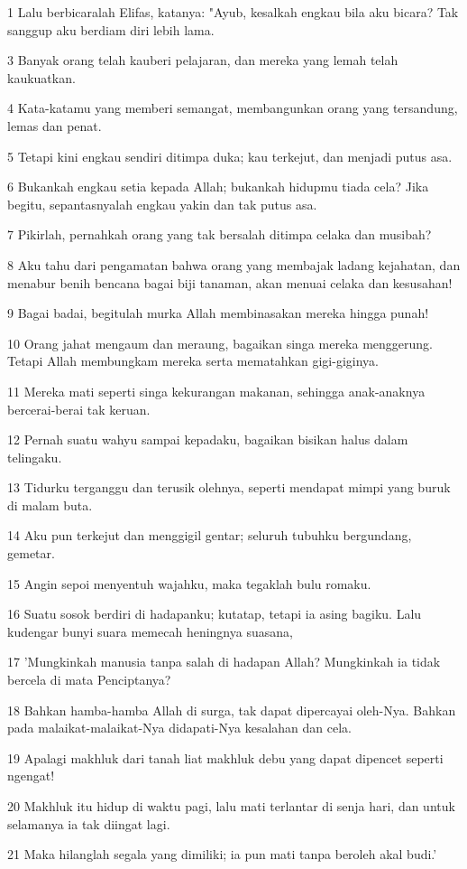 \par 1 Lalu berbicaralah Elifas, katanya: "Ayub, kesalkah engkau bila aku bicara? Tak sanggup aku berdiam diri lebih lama.
\par 3 Banyak orang telah kauberi pelajaran, dan mereka yang lemah telah kaukuatkan.
\par 4 Kata-katamu yang memberi semangat, membangunkan orang yang tersandung, lemas dan penat.
\par 5 Tetapi kini engkau sendiri ditimpa duka; kau terkejut, dan menjadi putus asa.
\par 6 Bukankah engkau setia kepada Allah; bukankah hidupmu tiada cela? Jika begitu, sepantasnyalah engkau yakin dan tak putus asa.
\par 7 Pikirlah, pernahkah orang yang tak bersalah ditimpa celaka dan musibah?
\par 8 Aku tahu dari pengamatan bahwa orang yang membajak ladang kejahatan, dan menabur benih bencana bagai biji tanaman, akan menuai celaka dan kesusahan!
\par 9 Bagai badai, begitulah murka Allah membinasakan mereka hingga punah!
\par 10 Orang jahat mengaum dan meraung, bagaikan singa mereka menggerung. Tetapi Allah membungkam mereka serta mematahkan gigi-giginya.
\par 11 Mereka mati seperti singa kekurangan makanan, sehingga anak-anaknya bercerai-berai tak keruan.
\par 12 Pernah suatu wahyu sampai kepadaku, bagaikan bisikan halus dalam telingaku.
\par 13 Tidurku terganggu dan terusik olehnya, seperti mendapat mimpi yang buruk di malam buta.
\par 14 Aku pun terkejut dan menggigil gentar; seluruh tubuhku bergundang, gemetar.
\par 15 Angin sepoi menyentuh wajahku, maka tegaklah bulu romaku.
\par 16 Suatu sosok berdiri di hadapanku; kutatap, tetapi ia asing bagiku. Lalu kudengar bunyi suara memecah heningnya suasana,
\par 17 'Mungkinkah manusia tanpa salah di hadapan Allah? Mungkinkah ia tidak bercela di mata Penciptanya?
\par 18 Bahkan hamba-hamba Allah di surga, tak dapat dipercayai oleh-Nya. Bahkan pada malaikat-malaikat-Nya didapati-Nya kesalahan dan cela.
\par 19 Apalagi makhluk dari tanah liat makhluk debu yang dapat dipencet seperti ngengat!
\par 20 Makhluk itu hidup di waktu pagi, lalu mati terlantar di senja hari, dan untuk selamanya ia tak diingat lagi.
\par 21 Maka hilanglah segala yang dimiliki; ia pun mati tanpa beroleh akal budi.'

